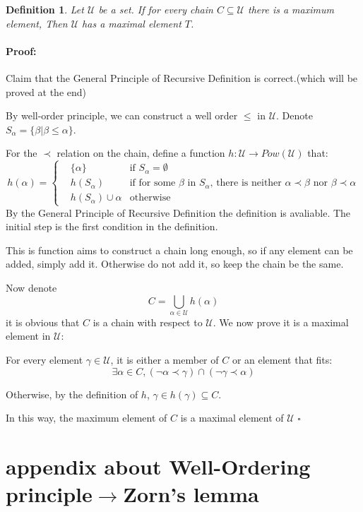 \documentclass{article}
\newtheorem{definition}[theorem]{Definition}
\newenvironment{myproof}{\ignorespaces\paragraph{Proof:}}{\hfill $\square$\par\noindent}
\begin{document}
\begin{definition}
Let $\mathscr U$ be a set. If for every chain $C\subseteq\mathscr U$ there is a maximum element, 
Then $\mathscr U$ has a maximal element $T$. 
\end{definition}
\begin{myproof}
    Claim that the General Principle of Recursive Definition is correct.(which will be proved at the end)

    By well-order principle, we can construct a well order $\leq$ in $\mathscr U$. 
    Denote $S_\alpha=\{\beta|\beta\leq\alpha\}$. 
    
    For the $\prec$ relation on the chain, define a function $h:\mathscr U\rightarrow Pow(\mathscr U)$ 
    that: 
    \begin{equation}
        h(\alpha)=\left\{
        \begin{aligned}
            &\{\alpha\}&\text{if $S_\alpha=\emptyset$}\\
            &h(S_\alpha)&\text{if for some $\beta$ in $S_\alpha$, there is neither $\alpha\prec\beta$ nor $\beta\prec\alpha$}\\
            &h(S_\alpha)\cup\alpha&\text{otherwise}
        \end{aligned}
        \right.
    \end{equation}
    By the General Principle of Recursive Definition the definition is avaliable. 
    The initial step is the first condition in the definition. 

    This is function aims to construct a chain long enough, so if any element can be added, 
    simply add it. Otherwise do not add it, so keep the chain be the same. 

    Now denote 
    $$C=\bigcup_{\alpha\in\mathscr U}h(\alpha)$$ 
    it is obvious that $C$ is a chain with respect to $\mathscr U$. We now prove it is a maximal element in $\mathscr U$: 

    For every element $\gamma\in\mathscr U$, 
    it is either a member of $C$ or an element that fits: 
    $$\exists \alpha\in C, (\neg\alpha\prec\gamma)\cap(\neg\gamma\prec\alpha)$$

    Otherwise, by the definition of $h$, $\gamma\in h(\gamma)\subseteq C$. 

    In this way, the maximum element of $C$ is a maximal element of $\mathscr U$
\end{myproof}

\section{appendix about Well-Ordering principle$\rightarrow$Zorn's lemma}
\end{document}
